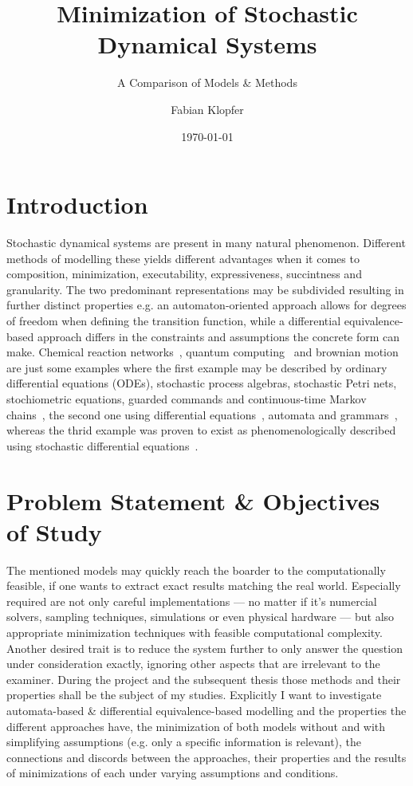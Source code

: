 \documentclass[11pt, rgb]{scrartcl}
\date{\today}
\author{Fabian Klopfer}
\title{Minimization of Stochastic Dynamical Systems}
\subtitle{A Comparison of Models \& Methods}
\begin{document}
\restoregeometry


\section{Introduction} Stochastic dynamical systems are present in many natural phenomenon. Different methods of modelling these yields different advantages when it comes to composition, minimization, executability, expressiveness, succintness and granularity. The two predominant representations may be subdivided resulting in further distinct properties e.g. an automaton-oriented approach allows for degrees of freedom when defining the transition function, while a differential equivalence-based approach differs in the constraints and assumptions the concrete form can make.
 Chemical reaction networks~\autocite{mc_agg_crn}, quantum computing~\autocite{moore2000quantum} and brownian motion~\autocite{einstein1906theory} are just some examples where the first example may be described by ordinary differential equations (ODEs), stochastic process algebras, stochastic Petri nets, stochiometric equations, guarded commands and continuous-time Markov chains~\cite{wolf}, the second one using differential equations~\autocite{von2018mathematical}, automata and grammars~\autocite{moore2000quantum}, whereas the thrid example was proven to exist as phenomenologically described using stochastic differential equations~\autocite{einstein1906theory}. \\
 

\section{Problem Statement \& Objectives of Study}
The mentioned models may quickly reach the boarder to the computationally feasible, if one wants to extract exact results matching the real world. Especially required are not only careful implementations --- no matter if it's numercial solvers, sampling techniques, simulations or even physical hardware --- but also appropriate minimization techniques with feasible computational complexity. Another desired trait is to reduce the system further to only answer the question under consideration exactly, ignoring other aspects that are irrelevant to the examiner. During the project and the subsequent thesis those methods and their properties shall be the subject of my studies. Explicitly I want to investigate automata-based \& differential equivalence-based modelling and the properties the different approaches have, the minimization of both models without and with simplifying assumptions (e.g. only a specific information is relevant), the connections and discords between the approaches, their properties and the results of minimizations of each under varying assumptions and conditions.
\end{document}
